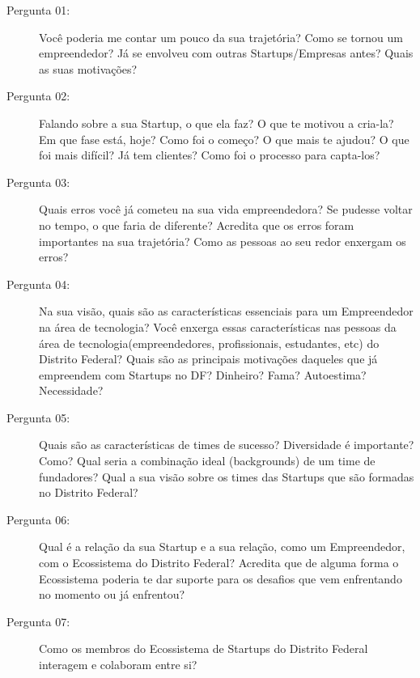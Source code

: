 \begin{description}


  \item [Pergunta 01:] Você poderia me contar um pouco da sua trajetória? Como se tornou um empreendedor? Já se envolveu com outras Startups/Empresas antes? Quais as suas motivações? 

  \item [Pergunta 02:] Falando sobre a sua Startup, o que ela faz? O que te motivou a cria-la? Em que fase está, hoje? Como foi o começo? O que mais te ajudou? O que foi mais difícil? Já tem clientes? Como foi o processo para capta-los?


  \item [Pergunta 03:] Quais erros você já cometeu na sua vida empreendedora? Se pudesse voltar no tempo, o que faria de diferente? Acredita que os erros foram importantes na sua trajetória? Como as pessoas ao seu redor enxergam os erros? 

  \item [Pergunta 04:] Na sua visão, quais são as características essenciais para um Empreendedor na área de tecnologia? Você enxerga essas características nas pessoas da área de tecnologia(empreendedores, profissionais, estudantes, etc) do Distrito Federal? Quais são as principais motivações daqueles que já empreendem com Startups no DF? Dinheiro? Fama? Autoestima? Necessidade?
  
  \item [Pergunta 05:] Quais são as características de times de sucesso? Diversidade é importante? Como? Qual seria a combinação ideal (backgrounds) de um time de fundadores? Qual a sua visão sobre os times das Startups que são formadas no Distrito Federal?


  \item [Pergunta 06:] Qual é a relação da sua Startup e a sua relação, como um Empreendedor, com o Ecossistema do Distrito Federal? Acredita que de alguma forma o Ecossistema poderia te dar suporte para os desafios que vem enfrentando no momento ou já enfrentou?

  \item [Pergunta 07:] Como os membros do Ecossistema de Startups do Distrito Federal interagem e colaboram entre si?


\end{description}
